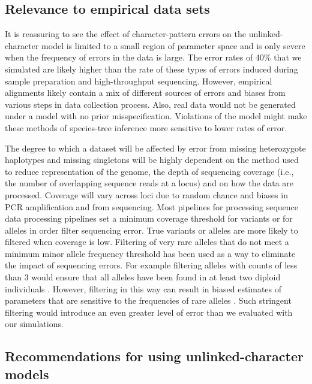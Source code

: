 \subsection{Relevance to empirical data sets}
It is reassuring to see the effect of character-pattern errors on the
unlinked-character model is limited to a small region of parameter space and is
only severe when the frequency of errors in the data is large.
The error rates of 40\% that we simulated are likely higher than the rate of
these types of errors induced during sample preparation and high-throughput 
sequencing. However, empirical alignments likely contain a mix of different sources of
errors and biases from various steps in data collection process.
Also, real data would not be generated under a model with no prior misspecification.
Violations of the model might make these methods of species-tree inference more
sensitive to lower rates of error.

The degree to which a dataset will be affected by error from missing
heterozygote haplotypes and missing singletons will be highly dependent on the 
method used to reduce representation of the genome, the depth of sequencing 
coverage (i.e., the number of overlapping sequence reads at
a locus) and on how the data are processed. Coverage will vary across loci due 
to random chance and biases in PCR amplification and from sequencing.
Most pipelines for processing sequence data processing pipelines set 
a minimum coverage threshold for variants or for alleles in order filter
sequencing error. True variants or alleles are more likely to filtered when
coverage is low. 
Filtering of very rare alleles that do not meet a minimum minor allele 
frequency threshold has been used as a way to eliminate the impact of 
sequencing errors. 
For example filtering alleles with counts of less than 3 would ensure that all
alleles have been found in at least two diploid individuals
\citep{rochetteStacksAnalyticalMethods2019}.
However, filtering in this way can result in biased estimates of parameters that
are sensitive to the frequencies of rare alleles
\citep{linckMinorAlleleFrequency2019}. Such stringent filtering would introduce
an even greater level of error than we evaluated with our simulations.

\subsection{Recommendations for using unlinked-character models}


